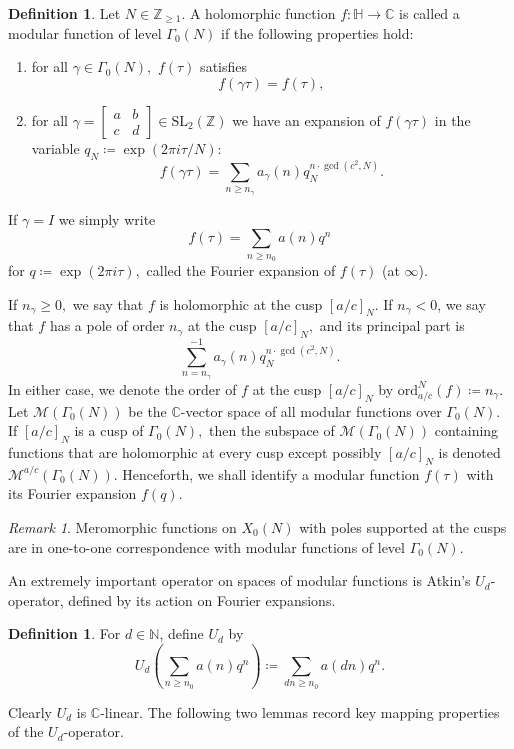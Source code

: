 \documentclass[12pt, reqno]{amsart}
\theoremstyle{definition}
\newtheorem{defn}[thm]{Definition}
\theoremstyle{remark}
\newtheorem*{rem}{Remark}
\newcommand{\CC}{\mathbb{C}}
\newcommand{\ZZ}{\mathbb{Z}}
\newcommand{\NN}{\mathbb{N}}
\newcommand{\HH}{\mathbb{H}}
\newcommand{\SL}{\text{SL}_2(\ZZ)}
\newcommand{\mat}[4]{\begin{bmatrix} #1 & #2 \\ #3 & #4 \end{bmatrix}}
\begin{document}
\begin{defn}
Let $N \in \mathbb{Z}_{\geq 1}$. A holomorphic function $f : \HH \rightarrow \CC$ is called a modular function of level $\Gamma_0(N)$ if the following properties hold:
\begin{enumerate}
\item for all $\gamma \in \Gamma_0(N),$ $f(\tau)$ satisfies
\[f(\gamma \tau)=  f(\tau),\]
\item for all $\gamma = \mat{a}{b}{c}{d} \in \SL$ we have an expansion of $f(\gamma \tau)$ in the variable $q_N \coloneqq \exp(2\pi i \tau/N)$:
\[f(\gamma \tau) = \sum\limits_{n \geq n_\gamma} a_\gamma(n) q_N^{n \cdot \gcd(c^2,N)}.\]
\end{enumerate}
If $\gamma = I$ we simply write
\[f(\tau) = \sum\limits_{n \geq n_0} a(n)q^n\]
for $q \coloneqq \exp(2\pi i \tau),$ called the Fourier expansion of $f(\tau)$ (at $\infty$).
\end{defn}
If $n_\gamma \geq 0,$ we say that $f$ is holomorphic at the cusp $[a/c]_{N}.$ If $n_\gamma <0$, we say that $f$ has a pole of order $n_\gamma$ at the cusp $[a/c]_{N},$ and its principal part is 
\[\sum\limits_{n=n_\gamma}^{-1} a_\gamma(n) q_N^{n \cdot \gcd(c^2,N)}.\]
In either case, we denote the order of $f$ at the cusp $[a/c]_{N}$ by $\text{ord}_{a/c}^N(f) \coloneqq n_\gamma.$ Let $\mathcal{M}(\Gamma_0(N))$ be the $\CC$-vector space of all modular functions over $\Gamma_0(N)$. If $[a/c]_{N}$ is a cusp of $\Gamma_0(N),$ then the subspace of $\mathcal{M}(\Gamma_0(N))$ containing functions that are holomorphic at every cusp except possibly $[a/c]_N$ is denoted $\mathcal{M}^{a/c}(\Gamma_0(N))$. Henceforth, we shall identify a modular function $f(\tau)$ with its Fourier expansion $f(q)$. 

\begin{rem}
Meromorphic functions on $X_0(N)$ with poles supported at the cusps are in one-to-one correspondence with modular functions of level $\Gamma_0(N).$
\end{rem}

An extremely important operator on spaces of modular functions is Atkin's $U_d$-operator, defined by its action on Fourier expansions. 

\begin{defn}
For $d \in \NN$, define $U_d$ by 
\begin{equation}\label{eq:U}
U_d \left(\sum\limits_{n \geq n_0} a(n) q^n \right) \coloneqq \sum\limits_{dn \geq n_0} a(dn) q^n. 
\end{equation}
\end{defn}
Clearly $U_d$ is $\mathbb{C}$-linear. The following two lemmas record key mapping properties of the $U_d$-operator.
\end{document}
